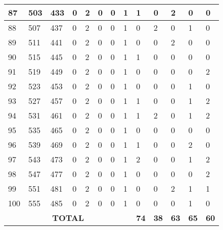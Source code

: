 \begin{sidewaystable}[!h]
\begin{tabular}{|l|l|l|l|l|l|l|l|l|l|l|l|l|}
			87 & 503 & 433 & 0 & 2 & 0 & 0 & 1 & 1 & 0 & 2 & 0 & 0 \\ \hline
			88 & 507 & 437 & 0 & 2 & 0 & 0 & 1 & 0 & 2 & 0 & 1 & 0 \\ \hline
			89 & 511 & 441 & 0 & 2 & 0 & 0 & 1 & 0 & 0 & 2 & 0 & 0 \\ \hline
			90 & 515 & 445 & 0 & 2 & 0 & 0 & 1 & 1 & 0 & 0 & 0 & 0 \\ \hline
			91 & 519 & 449 & 0 & 2 & 0 & 0 & 1 & 0 & 0 & 0 & 0 & 2 \\ \hline
			92 & 523 & 453 & 0 & 2 & 0 & 0 & 1 & 0 & 0 & 0 & 1 & 0 \\ \hline
			93 & 527 & 457 & 0 & 2 & 0 & 0 & 1 & 1 & 0 & 0 & 1 & 2 \\ \hline
			94 & 531 & 461 & 0 & 2 & 0 & 0 & 1 & 1 & 2 & 0 & 1 & 2 \\ \hline
			95 & 535 & 465 & 0 & 2 & 0 & 0 & 1 & 0 & 0 & 0 & 0 & 0 \\ \hline
			96 & 539 & 469 & 0 & 2 & 0 & 0 & 1 & 1 & 0 & 0 & 2 & 0 \\ \hline
			97 & 543 & 473 & 0 & 2 & 0 & 0 & 1 & 2 & 0 & 0 & 1 & 2 \\ \hline
			98 & 547 & 477 & 0 & 2 & 0 & 0 & 1 & 0 & 0 & 0 & 0 & 2 \\ \hline
			99 & 551 & 481 & 0 & 2 & 0 & 0 & 1 & 0 & 0 & 2 & 1 & 1 \\ \hline
			100 & 555 & 485 & 0 & 2 & 0 & 0 & 1 & 0 & 0 & 0 & 1 & 0 \\ \hline
			\multicolumn{8}{|c|}{\textbf{TOTAL}} & \textbf{74} & \textbf{38} & \textbf{63} & \textbf{65} & \textbf{60} \\ \hline
		\end{tabular}
\end{sidewaystable}
\clearpage



